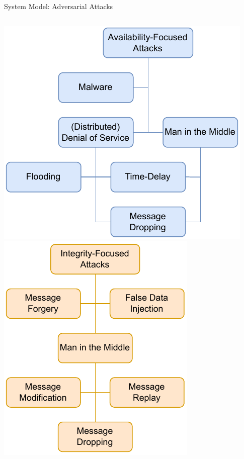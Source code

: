 \documentclass[en]{sdqbeamer}
\begin{document}
\begin{frame}{System Model: Adversarial Attacks}
    \begin{columns}
        \centering
        \includegraphics[width=\linewidth]{figures/attacks_availability.drawio.pdf}
        \centering
        \includegraphics[width=\linewidth]{figures/attacks_integrity.drawio.pdf}

\end{columns}
\end{frame}
\end{document}
